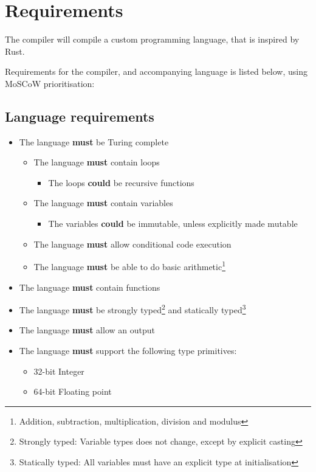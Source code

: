 \newpage
\section{Requirements}
The compiler will compile a custom programming language, that is inspired by Rust.

Requirements for the compiler, and accompanying language is listed below, using MoSCoW prioritisation:

\subsection{Language requirements} %

\begin{itemize}
\item The language \textbf{must} be Turing complete
\begin{itemize}
\item The language \textbf{must} contain loops
\begin{itemize}
\item The loops \textbf{could} be recursive functions
\end{itemize}
\item The language \textbf{must} contain variables
\begin{itemize}
\item The variables \textbf{could} be immutable, unless explicitly made mutable
\end{itemize}
\item The language \textbf{must} allow conditional code execution
\item The language \textbf{must} be able to do basic arithmetic\footnote{Addition, subtraction, multiplication, division and modulus}
\end{itemize}
\item The language \textbf{must} contain functions
\item The language \textbf{must} be strongly typed\footnote{Strongly typed: Variable types does not change, except by explicit casting} and statically typed\footnote{Statically typed: All variables must have an explicit type at initialisation}
\item The language \textbf{must} allow an output
\item The language \textbf{must} support the following type primitives:
\begin{itemize}
\item 32-bit Integer
\item 64-bit Floating point

\end{itemize}
\end{itemize}
